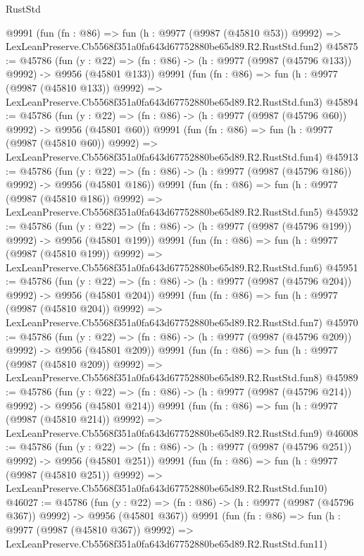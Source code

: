 \begin{lexlean}{RustStd}
\begin{coremodule}
    @9991
    (fun (fn : @86) =>
    fun (h : @9977 (@9987 (@45810 @53)) @9992) =>
    LexLeanPreserve.Cb5568f351a0fa643d67752880be65d89.R2.RustStd.fun2)
@45875 := @45786
    (fun (y : @22) => (fn : @86) -> (h : @9977 (@9987 (@45796 @133)) @9992) -> @9956 (@45801 @133))
    @9991
    (fun (fn : @86) =>
    fun (h : @9977 (@9987 (@45810 @133)) @9992) =>
    LexLeanPreserve.Cb5568f351a0fa643d67752880be65d89.R2.RustStd.fun3)
@45894 := @45786
    (fun (y : @22) => (fn : @86) -> (h : @9977 (@9987 (@45796 @60)) @9992) -> @9956 (@45801 @60))
    @9991
    (fun (fn : @86) =>
    fun (h : @9977 (@9987 (@45810 @60)) @9992) =>
    LexLeanPreserve.Cb5568f351a0fa643d67752880be65d89.R2.RustStd.fun4)
@45913 := @45786
    (fun (y : @22) => (fn : @86) -> (h : @9977 (@9987 (@45796 @186)) @9992) -> @9956 (@45801 @186))
    @9991
    (fun (fn : @86) =>
    fun (h : @9977 (@9987 (@45810 @186)) @9992) =>
    LexLeanPreserve.Cb5568f351a0fa643d67752880be65d89.R2.RustStd.fun5)
@45932 := @45786
    (fun (y : @22) => (fn : @86) -> (h : @9977 (@9987 (@45796 @199)) @9992) -> @9956 (@45801 @199))
    @9991
    (fun (fn : @86) =>
    fun (h : @9977 (@9987 (@45810 @199)) @9992) =>
    LexLeanPreserve.Cb5568f351a0fa643d67752880be65d89.R2.RustStd.fun6)
@45951 := @45786
    (fun (y : @22) => (fn : @86) -> (h : @9977 (@9987 (@45796 @204)) @9992) -> @9956 (@45801 @204))
    @9991
    (fun (fn : @86) =>
    fun (h : @9977 (@9987 (@45810 @204)) @9992) =>
    LexLeanPreserve.Cb5568f351a0fa643d67752880be65d89.R2.RustStd.fun7)
@45970 := @45786
    (fun (y : @22) => (fn : @86) -> (h : @9977 (@9987 (@45796 @209)) @9992) -> @9956 (@45801 @209))
    @9991
    (fun (fn : @86) =>
    fun (h : @9977 (@9987 (@45810 @209)) @9992) =>
    LexLeanPreserve.Cb5568f351a0fa643d67752880be65d89.R2.RustStd.fun8)
@45989 := @45786
    (fun (y : @22) => (fn : @86) -> (h : @9977 (@9987 (@45796 @214)) @9992) -> @9956 (@45801 @214))
    @9991
    (fun (fn : @86) =>
    fun (h : @9977 (@9987 (@45810 @214)) @9992) =>
    LexLeanPreserve.Cb5568f351a0fa643d67752880be65d89.R2.RustStd.fun9)
@46008 := @45786
    (fun (y : @22) => (fn : @86) -> (h : @9977 (@9987 (@45796 @251)) @9992) -> @9956 (@45801 @251))
    @9991
    (fun (fn : @86) =>
    fun (h : @9977 (@9987 (@45810 @251)) @9992) =>
    LexLeanPreserve.Cb5568f351a0fa643d67752880be65d89.R2.RustStd.fun10)
@46027 := @45786
    (fun (y : @22) => (fn : @86) -> (h : @9977 (@9987 (@45796 @367)) @9992) -> @9956 (@45801 @367))
    @9991
    (fun (fn : @86) =>
    fun (h : @9977 (@9987 (@45810 @367)) @9992) =>
    LexLeanPreserve.Cb5568f351a0fa643d67752880be65d89.R2.RustStd.fun11)

\end{coremodule}
\end{lexlean}
